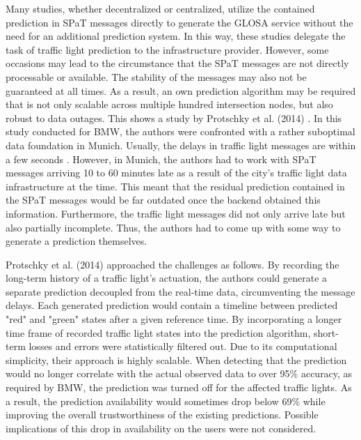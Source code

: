 Many studies, whether decentralized or centralized, utilize the contained prediction in SPaT messages directly to generate the GLOSA service without the need for an additional prediction system. In this way, these studies delegate the task of traffic light prediction to the infrastructure provider. However, some occasions may lead to the circumstance that the SPaT messages are not directly processable or available. The stability of the messages may also not be guaranteed at all times. As a result, an own prediction algorithm may be required that is not only scalable across multiple hundred intersection nodes, but also robust to data outages. This shows a study by Protschky et al. (2014) \cite{protschky_extensive_2014, protschky_adaptive_2014}. In this study conducted for BMW, the authors were confronted with a rather suboptimal data foundation in Munich. Usually, the delays in traffic light messages are within a few seconds \cite{neuner_leitfaden_2020}. However, in Munich, the authors had to work with SPaT messages arriving 10 to 60 minutes late as a result of the city's traffic light data infrastructure at the time. This meant that the residual prediction contained in the SPaT messages would be far outdated once the backend obtained this information. Furthermore, the traffic light messages did not only arrive late but also partially incomplete. Thus, the authors had to come up with some way to generate a prediction themselves. 

Protschky et al. (2014) \cite{protschky_extensive_2014, protschky_adaptive_2014} approached the challenges as follows. By recording the long-term history of a traffic light's actuation, the authors could generate a separate prediction decoupled from the real-time data, circumventing the message delays. Each generated prediction would contain a timeline between predicted "red" and "green" states after a given reference time. By incorporating a longer time frame of recorded traffic light states into the prediction algorithm, short-term losses and errors were statistically filtered out. Due to its computational simplicity, their approach is highly scalable. When detecting that the prediction would no longer correlate with the actual observed data to over 95\% accuracy, as required by BMW, the prediction was turned off for the affected traffic lights. As a result, the prediction availability would sometimes drop below 69\% while improving the overall trustworthiness of the existing predictions. Possible implications of this drop in availability on the users were not considered.

